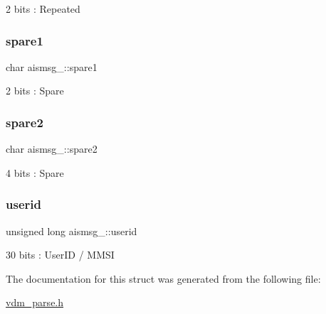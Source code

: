 2 bits \+: Repeated 

\mbox{\label{structaismsg__16_a5458942f28ab2515b519f6a1d18845db}} 
\subsubsection{\texorpdfstring{spare1}{spare1}}
{\footnotesize\ttfamily char aismsg\+\_\+::spare1}



2 bits \+: Spare 

\mbox{\label{structaismsg__16_a85c81d792d81c32b331d49d06be1ca78}} 
\subsubsection{\texorpdfstring{spare2}{spare2}}
{\footnotesize\ttfamily char aismsg\+\_\+::spare2}



4 bits \+: Spare 

\mbox{\label{structaismsg__16_a7e811edb86e859681646be5aad3970a6}} 
\subsubsection{\texorpdfstring{userid}{userid}}
{\footnotesize\ttfamily unsigned long aismsg\+\_\+::userid}



30 bits \+: User\+ID / M\+M\+SI 



The documentation for this struct was generated from the following file\+:\begin{DoxyCompactItemize}
\item 
\mbox{\hyperlink{vdm__parse_8h}{vdm\+\_\+parse.\+h}}\end{DoxyCompactItemize}
